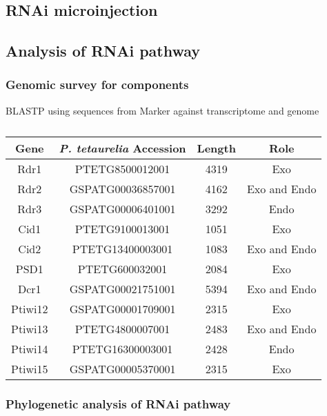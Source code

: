 \subsection{RNAi microinjection}

\subsection{Analysis of RNAi pathway}

\subsubsection{Genomic survey for components}

BLASTP using sequences from Marker against transcriptome
and genome

\begin{table}
    \centering
    \begin{tabular}{|c|c|c|c|}
        \hline
        \textbf{Gene} & \textbf{\textit{P. tetaurelia} Accession} & \textbf{Length} & \textbf{Role} \\
        \hline
        Rdr1 & PTETG8500012001 & 4319 & Exo\\
        Rdr2 & GSPATG00036857001 & 4162 & Exo and Endo\\
        Rdr3 & GSPATG00006401001 & 3292 & Endo \\
        Cid1 & PTETG9100013001 & 1051 & Exo\\
        Cid2 & PTETG13400003001 & 1083 & Exo and Endo \\
        PSD1 & PTETG600032001 & 2084 & Exo \\
        Dcr1 & GSPATG00021751001 & 5394 & Exo and Endo\\
        Ptiwi12 & GSPATG00001709001 & 2315 & Exo \\
        Ptiwi13 & PTETG4800007001 & 2483 & Exo and Endo \\
        Ptiwi14 & PTETG16300003001 & 2428 & Endo \\
        Ptiwi15 & GSPATG00005370001 & 2315 & Exo \\
        \hline
    \end{tabular}
    \caption[RNAi pathway components from Marker]{\citep{Marker2014}}
\end{table}



\subsubsection{Phylogenetic analysis of RNAi pathway}




